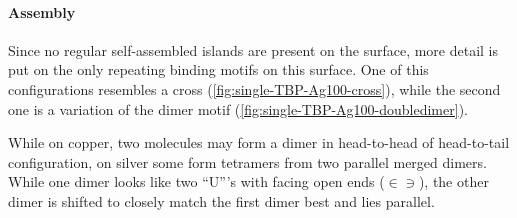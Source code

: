 \paragraph{Assembly}
Since no regular self-assembled islands are present on the surface, more detail is put on the only repeating binding motifs on this surface. One of this configurations resembles a cross (\autoref{fig:single-TBP-Ag100-cross}), while the second one is a variation of the dimer motif (\autoref{fig:single-TBP-Ag100-doubledimer}).


While on copper, two molecules may form a dimer in head-to-head of head-to-tail configuration, on silver some form tetramers from two parallel merged dimers. While one dimer looks like two ``U'''s with facing open ends ($\in \ni$), the other dimer is shifted to closely match the first dimer best and lies parallel.

%

